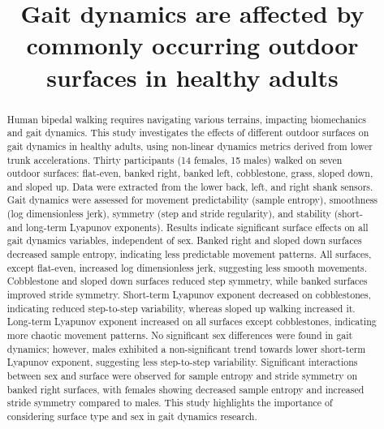 \documentclass[authoryear,preprint,review,12pt]{elsarticle}
\begin{document}
\begin{frontmatter}

\title{Gait dynamics are affected by commonly occurring outdoor surfaces in healthy adults}






\begin{abstract}
Human bipedal walking requires navigating various terrains, impacting biomechanics and gait dynamics. This study investigates the effects of different outdoor surfaces on gait dynamics in healthy adults, using non-linear dynamics metrics derived from lower trunk accelerations. Thirty participants (14 females, 15 males) walked on seven outdoor surfaces: flat-even, banked right, banked left, cobblestone, grass, sloped down, and sloped up. Data were extracted from the lower back, left, and right shank sensors. Gait dynamics were assessed for movement predictability (sample entropy), smoothness (log dimensionless jerk), symmetry (step and stride regularity), and stability (short- and long-term Lyapunov exponents). Results indicate significant surface effects on all gait dynamics variables, independent of sex. Banked right and sloped down surfaces decreased sample entropy, indicating less predictable movement patterns. All surfaces, except flat-even, increased log dimensionless jerk, suggesting less smooth movements. Cobblestone and sloped down surfaces reduced step symmetry, while banked surfaces improved stride symmetry. Short-term Lyapunov exponent decreased on cobblestones, indicating reduced step-to-step variability, whereas sloped up walking increased it. Long-term Lyapunov exponent increased on all surfaces except cobblestones, indicating more chaotic movement patterns. No significant sex differences were found in gait dynamics; however, males exhibited a non-significant trend towards lower short-term Lyapunov exponent, suggesting less step-to-step variability. Significant interactions between sex and surface were observed for sample entropy and stride symmetry on banked right surfaces, with females showing decreased sample entropy and increased stride symmetry compared to males. This study highlights the importance of considering surface type and sex in gait dynamics research. 
\end{abstract}


\end{frontmatter}
\end{document}
